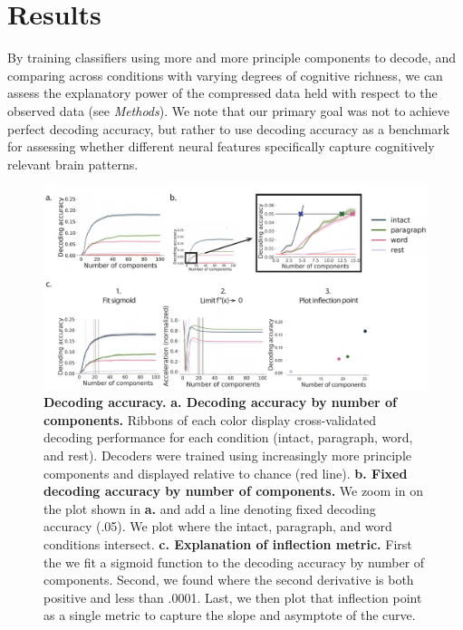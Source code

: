 \documentclass[english]{article}
\begin{document}
\section*{Results}
By training classifiers using more and more principle components to decode, and comparing across conditions with varying degrees of cognitive richness, we can assess the explanatory power of the compressed data held with respect to the observed data (see \textit{Methods}). We note that our primary goal was not to achieve perfect decoding accuracy, but rather to use decoding accuracy as a benchmark for assessing whether different neural features specifically capture cognitively relevant brain patterns.

\begin{figure}
  \centering
  \includegraphics[width=\textwidth]{figs/decode_interpret.pdf}
  \caption{\textbf{Decoding accuracy.} \textbf{a. Decoding accuracy by
      number of components.} Ribbons of each color display
    cross-validated decoding performance for each condition (intact,
    paragraph, word, and rest). Decoders were trained using
    increasingly more principle components and displayed relative to
    chance (red line). \textbf{b. Fixed decoding accuracy by number of
      components.} We zoom in on the plot shown in \textbf{a.} and add
    a line denoting fixed decoding accuracy (.05). We plot where the
    intact, paragraph, and word conditions intersect.
    \textbf{c. Explanation of inflection metric.} First the we fit a sigmoid function to the decoding accuracy by number of components. Second, we found where the second derivative is both positive and less than .0001. Last, we then plot that inflection point as a single metric to capture the slope and asymptote of the curve.}
    \label{fig:decode_interpret}
  \end{figure}
\end{document}
